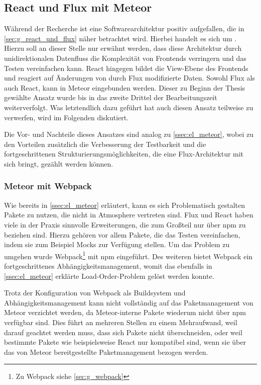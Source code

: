 \subsection{React und Flux mit Meteor}
\label{ssec:el_react_und_flux_mit_meteor}

Während der Recherche ist eine Softwarearchitektur positiv aufgefallen, die in
\cref{sec:g_react_und_flux} näher betrachtet wird.  Hierbei handelt es sich um
.  Hierzu soll an dieser Stelle nur erwähnt werden, dass diese
Architektur durch unidirektionalen Datenfluss die Komplexität von Frontends
verringern und das Testen vereinfachen kann.  React hingegen bildet die
View-Ebene des Frontends und reagiert auf Änderungen von durch Flux modifizierte
Daten.  Sowohl Flux als auch React, kann in Meteor eingebunden werden.  Dieser
zu Beginn der Thesis gewählte Ansatz wurde bis in das zweite Drittel der
Bearbeitungszeit weiterverfolgt.  Was letztendlich dazu geführt hat auch diesen
Ansatz teilweise zu verwerfen, wird im Folgenden diskutiert.

Die Vor- und Nachteile dieses Ansatzes sind analog zu \cref{ssec:el_meteor},
wobei zu den Vorteilen zusätzlich die Verbesserung der Testbarkeit und die
fortgeschrittenen Strukturierungsmöglichkeiten, die eine Flux-Architektur mit
sich bringt, gezählt werden können.

\subsubsection{Meteor mit Webpack}
\label{sssec:elf_meteor_mit_webpack}

Wie bereits in \cref{ssec:el_meteor} erläutert, kann es sich Problematisch
gestalten Pakete zu nutzen, die nicht in Atmosphere vertreten sind.  Flux und
React haben viele in der Praxis sinnvolle Erweiterungen, die zum Großteil nur
über npm zu beziehen sind.  Hierzu gehören vor allem Pakete, die das Testen
vereinfachen, indem sie zum Beispiel Mocks zur Verfügung stellen.  Um das
Problem zu umgehen wurde Webpack\footnote{Zu Webpack siehe \cref{sec:g_webpack}}
mit npm eingeführt.  Des weiteren bietet Webpack ein fortgeschrittenes
Abhängigkeitsmanagement, womit das ebenfalls in \cref{ssec:el_meteor} erklärte
Load-Order-Problem gelöst werden konnte.

Trotz der Konfiguration von Webpack als Buildsystem und Abhängigkeitsmanagement
kann nicht vollständig auf das Paketmanagement von Meteor verzichtet werden, da
Meteor-interne Pakete wiederum nicht über npm verfügbar sind.  Dies führt an
mehreren Stellen zu einem Mehraufwand, weil darauf geachtet werden muss, dass
sich Pakete nicht überschneiden, oder weil bestimmte Pakete wie beispielsweise
React nur kompatibel sind, wenn sie über das von Meteor bereitgestellte
Paketmanagement bezogen werden.

